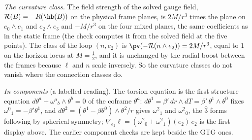 \emph{The curvature class.} The field strength of the solved gauge field, $\mathcal{R}(B) = -R(\hb(B))$ on the physical frame planes, is $2M/r^{3}$ times the plane on $e_{0}\wedge e_{1}$ and $e_{2}\wedge e_{3}$ and $-M/r^{3}$ on the four mixed planes, the same coefficients as in the static frame (the check computes it from the solved field at the five points). The class of the loop $(n, e_{2})$ is $\pv(-\mathcal{R}(n\wedge e_{2})) = 2M/r^{3}$, equal to $1$ on the horizon locus at $M = \tfrac12$, and it is unchanged by the radial boost between the frames because $\ell$ and $n$ scale inversely. So the curvature classes do not vanish where the connection classes do.

\emph{In components} (a labelled reading). The torsion equation is the first structure equation $d\theta^{a} + \omega^{a}{}_{b}\wedge\theta^{b} = 0$ of the coframe $\theta^{a}$: $d\theta^{1} = \beta'\,dr\wedge dT = \beta'\,\theta^{1}\wedge\theta^{0}$ fixes $\omega^{0}{}_{1} = -\beta'\theta^{1}$, and $d\theta^{2} = (\theta^{1} - \beta\theta^{0})\wedge\theta^{2}/r$ gives $\omega^{2}{}_{1}$ and $\omega^{2}{}_{0}$, the $\hat3$ forms following by spherical symmetry; $\nabla_{e_{2}}\ell = (\omega^{2}{}_{0} + \omega^{2}{}_{1})(e_{2})\,e_{2}$ is the first display above. The earlier component checks are kept beside the GTG ones.
